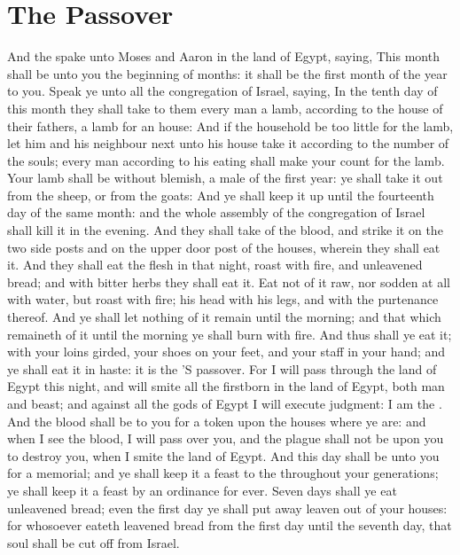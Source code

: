 \section*{The Passover}
\begin{biblechapter} %
\verse And the \LORD spake unto Moses and Aaron in the land of Egypt, saying,
\verse This month shall be unto you the beginning of months: it shall be the first month of the year to you.
\verse Speak ye unto all the congregation of Israel, saying, In the tenth day of this month they shall take to them every man a lamb, according to the house of their fathers, a lamb for an house:
\verse And if the household be too little for the lamb, let him and his neighbour next unto his house take it according to the number of the souls; every man according to his eating shall make your count for the lamb.
\verse Your lamb shall be without blemish, a male of the first year: ye shall take it out from the sheep, or from the goats:
\verse And ye shall keep it up until the fourteenth day of the same month: and the whole assembly of the congregation of Israel shall kill it in the evening.
\verse And they shall take of the blood, and strike it on the two side posts and on the upper door post of the houses, wherein they shall eat it.
\verse And they shall eat the flesh in that night, roast with fire, and unleavened bread; and with bitter herbs they shall eat it.
\verse Eat not of it raw, nor sodden at all with water, but roast with fire; his head with his legs, and with the purtenance thereof.
\verse And ye shall let nothing of it remain until the morning; and that which remaineth of it until the morning ye shall burn with fire.
\verse And thus shall ye eat it; with your loins girded, your shoes on your feet, and your staff in your hand; and ye shall eat it in haste: it is the \LORD'S passover.
\verse For I will pass through the land of Egypt this night, and will smite all the firstborn in the land of Egypt, both man and beast; and against all the gods of Egypt I will execute judgment: I am the \LORD.
\verse And the blood shall be to you for a token upon the houses where ye are: and when I see the blood, I will pass over you, and the plague shall not be upon you to destroy you, when I smite the land of Egypt.
\verse And this day shall be unto you for a memorial; and ye shall keep it a feast to the \LORD throughout your generations; ye shall keep it a feast by an ordinance for ever.
\verse Seven days shall ye eat unleavened bread; even the first day ye shall put away leaven out of your houses: for whosoever eateth leavened bread from the first day until the seventh day, that soul shall be cut off from Israel.

\end{biblechapter}
